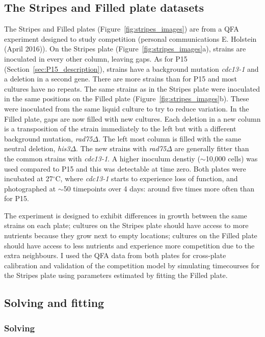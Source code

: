 \subsection{The Stripes and Filled plate datasets}
\label{sec:stripes_description}

The Stripes and Filled plates (Figure~\ref{fig:stripes_images}) are
from a QFA experiment designed to study competition (personal
communications E. Holstein (April 2016)). On the Stripes plate
(Figure~\ref{fig:stripes_images}a), strains are inoculated in every
other column, leaving gaps. As for P15
(Section~\ref{sec:P15_description}), strains have a background
mutation \textit{cdc13-1} and a deletion in a second gene. There are
more strains than for P15 and most cultures have no repeats. The same
strains as in the Stripes plate were inoculated in the same positions
on the Filled plate (Figure~\ref{fig:stripes_images}b). These were
inoculated from the same liquid culture to try to reduce variation. In
the Filled plate, gaps are now filled with new cultures. Each deletion
in a new column is a transposition of the strain immediately to the
left but with a different background mutation,
\textit{rad75}\(\Delta\). The left most column is filled with the same
neutral deletion, \textit{his3}\(\Delta\). The new strains with
\textit{rad75}\(\Delta\) are generally fitter than the common strains
with \textit{cdc13-1}. A higher inoculum denstiy (\(\sim\)10,000
cells) was used compared to P15 and this was detectable at time
zero. Both plates were incubated at 27\(^{\circ}\)C, where
\textit{cdc13-1} starts to experience loss of function, and
photographed at \(\sim\)50 timepoints over 4 days: around five times
more often than for P15.

The experiment is designed to exhibit differences in growth between
the same strains on each plate; cultures on the Stripes plate should
have access to more nutrients because they grow next to empty
locations; cultures on the Filled plate should have access to less
nutrients and experience more competition due to the extra
neighbours. I used the QFA data from both plates for cross-plate
calibration and validation of the competition model by simulating
timecourses for the Stripes plate using parameters estimated by
fitting the Filled plate.

\subsection{Solving and fitting}

\subsubsection{Solving}
\label{sec:solving_comp}

